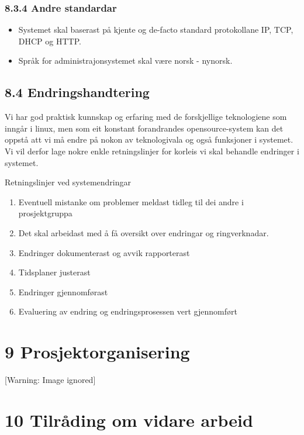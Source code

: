 \documentclass[12pt]{article}
\begin{document}
\subsubsection{8.3.4 Andre standardar}

\begin{itemize}
\item Systemet skal baserast på kjente og de{}-facto standard protokollane IP, TCP, DHCP og HTTP.
\item Språk for administrajonsystemet skal være norsk - nynorsk.
\end{itemize}
\subsection{8.4 Endringshandtering}

Vi har god praktisk kunnskap og erfaring med de forskjellige teknologiene som inngår i linux, men som eit konstant forandrandes opensource{}-system kan det oppstå att vi må endre på nokon av teknologivala og også funksjoner i systemet. Vi vil derfor lage nokre enkle retningslinjer for korleis vi skal behandle endringer i systemet.




Retningslinjer ved systemendringar

\begin{enumerate}
\item Eventuell mistanke om problemer meldast tidleg til dei andre i prosjektgruppa
\item Det skal arbeidast med å få oversikt over endringar og ringverknadar.
\item Endringer dokumenterast og avvik rapporterast
\item Tidsplaner justerast
\item Endringer gjennomførast
\item Evaluering av endring og endringsprosessen vert gjennomført
\end{enumerate}
\section{9 Prosjektorganisering}

  [Warning: Image ignored] %
 







\section{10 Tilråding om vidare arbeid}
\end{document}
